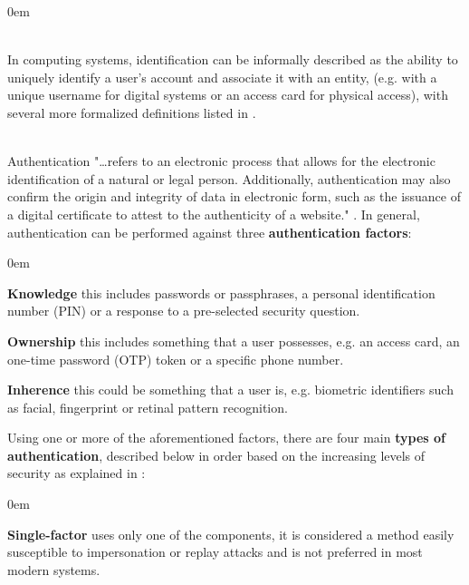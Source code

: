 \begin{description}
	\itemsep0em
	\item[Identification] \hfill \\
	In computing systems, identification can be informally described as the ability to uniquely identify a user's account and associate it with an entity, (e.g. with a unique username for digital systems or an access card for physical access), with several more formalized definitions listed in \cite{identification-def-nist}. 
	\item[Authentication] \hfill \\
	Authentication "\dots  refers to an electronic process that allows for the electronic identification of a natural or legal person. Additionally, authentication may also confirm the origin and integrity of data in electronic form, such as the issuance of a digital certificate to attest to the authenticity of a website." \cite{authentication-definition-cryptomathic}. 
	In general, authentication can be performed against three \textbf{authentication factors}:
	\begin{description}
		\itemsep0em
		\item \textbf{Knowledge} this includes passwords or passphrases, a personal identification number (PIN) or a response to a pre-selected security question. 
		\item \textbf{Ownership} this includes something that a user possesses, e.g. an access card, an one-time password (OTP) token or a specific phone number.
		\item \textbf{Inherence} this could be something that a user is, e.g. biometric identifiers such as facial, fingerprint or retinal pattern recognition. \cite{authentication-definition-cryptomathic}
	\end{description}
	Using one or more of the aforementioned factors, there are four main \textbf{types of authentication}, described below in order based on the increasing levels of security as explained in \cite{authentication-definition-cryptomathic}:
	\begin{description}
		\itemsep0em
		\item \textbf{Single-factor} uses only one of the components, it is considered a method easily susceptible to impersonation or replay attacks and is not preferred in most modern systems.

\end{description}
\end{description}
